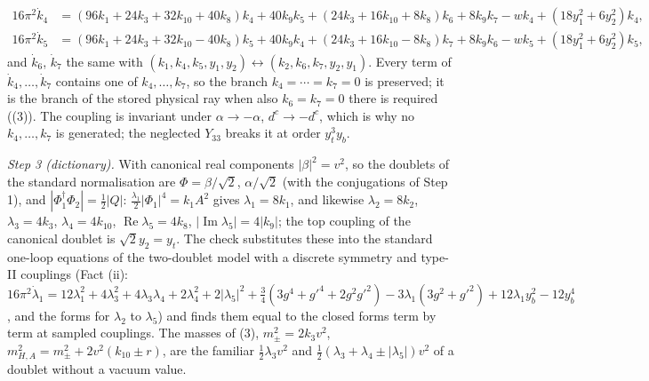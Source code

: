 \begin{align*}
16\pi^{2}\dot k_{4} &= (96k_{1} + 24k_{3} + 32k_{10} + 40k_{8})k_{4} + 40k_{9}k_{5} + (24k_{3} + 16k_{10} + 8k_{8})k_{6} + 8k_{9}k_{7} - wk_{4} + (18y_{1}^{2} + 6y_{2}^{2})k_{4},\\
16\pi^{2}\dot k_{5} &= (96k_{1} + 24k_{3} + 32k_{10} - 40k_{8})k_{5} + 40k_{9}k_{4} + (24k_{3} + 16k_{10} - 8k_{8})k_{7} + 8k_{9}k_{6} - wk_{5} + (18y_{1}^{2} + 6y_{2}^{2})k_{5},
\end{align*}
and $\dot k_{6}$, $\dot k_{7}$ the same with $(k_{1}, k_{4}, k_{5}, y_{1}, y_{2}) \leftrightarrow (k_{2}, k_{6}, k_{7}, y_{2}, y_{1})$. Every term of $\dot k_{4}, \ldots, \dot k_{7}$ contains one of $k_{4}, \ldots, k_{7}$, so the branch $k_{4} = \cdots = k_{7} = 0$ is preserved; it is the branch of the stored physical ray when also $k_{6} = k_{7} = 0$ there is required ((3)). The coupling is invariant under $\alpha \to -\alpha$, $d^{c} \to -d^{c}$, which is why no $k_{4}, \ldots, k_{7}$ is generated; the neglected $Y_{33}$ breaks it at order $y_{t}^{3}y_{b}$.

\emph{Step 3 (dictionary).} With canonical real components $|\beta|^{2} = v^{2}$, so the doublets of the standard normalisation are $\Phi = \beta/\sqrt2$, $\alpha/\sqrt2$ (with the conjugations of Step 1), and $|\Phi_{1}^{\dagger}\Phi_{2}| = \tfrac12|Q|$: $\tfrac{\lambda_{1}}{2}|\Phi_{1}|^{4} = k_{1}A^{2}$ gives $\lambda_{1} = 8k_{1}$, and likewise $\lambda_{2} = 8k_{2}$, $\lambda_{3} = 4k_{3}$, $\lambda_{4} = 4k_{10}$, $\operatorname{Re}\lambda_{5} = 4k_{8}$, $|\operatorname{Im}\lambda_{5}| = 4|k_{9}|$; the top coupling of the canonical doublet is $\sqrt2 y_{2} = y_{t}$. The check substitutes these into the standard one-loop equations of the two-doublet model with a discrete symmetry and type-II couplings (Fact (ii): $16\pi^{2}\dot\lambda_{1} = 12\lambda_{1}^{2} + 4\lambda_{3}^{2} + 4\lambda_{3}\lambda_{4} + 2\lambda_{4}^{2} + 2|\lambda_{5}|^{2} + \tfrac34(3g^{4} + g'^{4} + 2g^{2}g'^{2}) - 3\lambda_{1}(3g^{2} + g'^{2}) + 12\lambda_{1}y_{b}^{2} - 12y_{b}^{4}$, and the forms for $\lambda_{2}$ to $\lambda_{5}$) and finds them equal to the closed forms term by term at sampled couplings. The masses of (3), $m_{\pm}^{2} = 2k_{3}v^{2}$, $m_{H,A}^{2} = m_{\pm}^{2} + 2v^{2}(k_{10} \pm r)$, are the familiar $\tfrac12\lambda_{3}v^{2}$ and $\tfrac12(\lambda_{3} + \lambda_{4} \pm |\lambda_{5}|)v^{2}$ of a doublet without a vacuum value.

